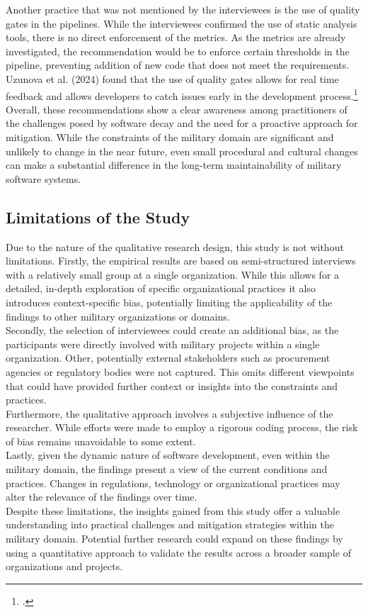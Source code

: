 Another practice that was not mentioned by the interviewees is the use of quality gates in the pipelines. While the interviewees confirmed the use of static analysis tools, there is no direct enforcement of the metrics. 
As the metrics are already investigated, the recommendation would be to enforce certain thresholds in the pipeline, preventing addition of new code that does not meet the requirements. Uzunova et al. (2024) found that the use of quality gates allows for real time feedback and allows developers to catch issues early in the development process.\footcite[8]{uzunovaQualityGatesSoftware2024}\\

Overall, these recommendations show a clear awareness among practitioners of the challenges posed by software decay and the need for a proactive approach for mitigation. While the constraints of the military domain are significant and unlikely to change in the near future, even small procedural and 
cultural changes can make a substantial difference in the long-term maintainability of military software systems.\\

\subsection{Limitations of the Study}
Due to the nature of the qualitative research design, this study is not without limitations. Firstly, the empirical results are based on semi-structured interviews with a relatively small group at a single organization.
While this allows for a detailed, in-depth exploration of specific organizational practices it also introduces context-specific bias, potentially limiting the applicability of the findings to other military organizations or domains.\\

Secondly, the selection of interviewees could create an additional bias, as the participants were directly involved with military projects within a single organization. Other, potentially external stakeholders such as procurement agencies
or regulatory bodies were not captured. This omits different viewpoints that could have provided further context or insights into the constraints and practices.\\

Furthermore, the qualitative approach involves a subjective influence of the researcher. While efforts were made to employ a rigorous coding process, the risk of bias remains unavoidable to some extent.\\

Lastly, given the dynamic nature of software development, even within the military domain, the findings present a view of the current conditions and practices. Changes in regulations, technology or organizational practices may alter the relevance of the findings over time.\\

Despite these limitations, the insights gained from this study offer a valuable understanding into practical challenges and mitigation strategies within the military domain. Potential further research could expand on these findings by using a quantitative approach to validate the results across a broader sample of organizations and projects.
